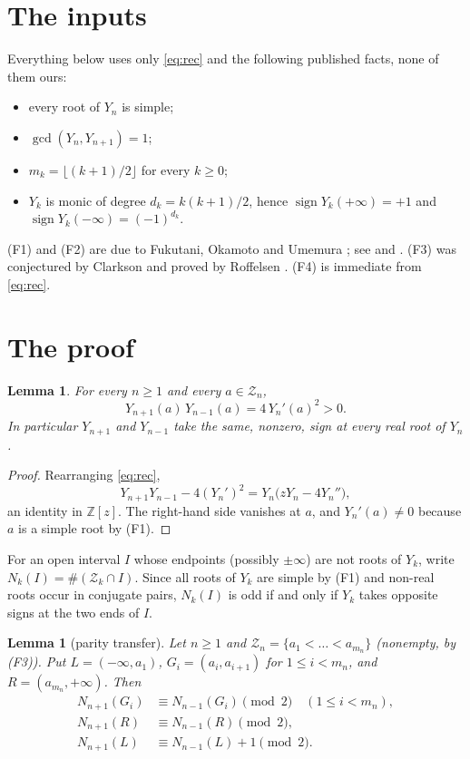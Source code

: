 \documentclass[11pt]{amsart}
\newtheorem{lemma}[theorem]{Lemma}
\theoremstyle{definition}
\DeclareMathOperator{\sgn}{sign}
\newcommand{\Zs}{\mathcal Z}
\newcommand{\NN}{N}
\begin{document}
\section{The inputs}

Everything below uses only \eqref{eq:rec} and the following published facts,
none of them ours:
\begin{itemize}
\item[(F1)] every root of $Y_n$ is simple;
\item[(F2)] $\gcd(Y_n,Y_{n+1})=1$;
\item[(F3)] $m_k=\lfloor(k+1)/2\rfloor$ for every $k\ge0$;
\item[(F4)] $Y_k$ is monic of degree $d_k=k(k+1)/2$, hence
 $\sgn Y_k(+\infty)=+1$ and $\sgn Y_k(-\infty)=(-1)^{d_k}$.
\end{itemize}
(F1) and (F2) are due to Fukutani, Okamoto and Umemura \cite{FOU}; see
\cite[Thm.~7.1]{ClarksonSMF} and \cite[Thm.~4]{Roffelsen2012}. (F3) was
conjectured by Clarkson \cite[Conj.~7.4]{ClarksonSMF} and proved by Roffelsen
\cite[Thm.~1]{Roffelsen2012}. (F4) is immediate from \eqref{eq:rec}.

\section{The proof}

\begin{lemma}\label{lem:sign}
For every $n\ge1$ and every $a\in\Zs_n$,
\[
 Y_{n+1}(a)\,Y_{n-1}(a)=4\,Y_n'(a)^2>0 .
\]
In particular $Y_{n+1}$ and $Y_{n-1}$ take the same, nonzero, sign at every real
root of $Y_n$.
\end{lemma}

\begin{proof}
Rearranging \eqref{eq:rec},
\begin{equation}\label{eq:l1}
 Y_{n+1}Y_{n-1}-4(Y_n')^2=Y_n\bigl(zY_n-4Y_n''\bigr),
\end{equation}
an identity in $\mathbb Z[z]$. The right-hand side vanishes at $a$, and
$Y_n'(a)\ne0$ because $a$ is a simple root by (F1).
\end{proof}

For an open interval $I$ whose endpoints (possibly $\pm\infty$) are not roots of
$Y_k$, write $\NN_k(I)=\#(\Zs_k\cap I)$. Since all roots of $Y_k$ are simple by
(F1) and non-real roots occur in conjugate pairs, $\NN_k(I)$ is odd if and only
if $Y_k$ takes opposite signs at the two ends of $I$.

\begin{lemma}[parity transfer]\label{lem:parity}
Let $n\ge1$ and $\Zs_n=\{a_1<\dots<a_{m_n}\}$ (nonempty, by (F3)). Put
$L=(-\infty,a_1)$, $G_i=(a_i,a_{i+1})$ for $1\le i<m_n$, and
$R=(a_{m_n},+\infty)$. Then
\begin{align*}
 \NN_{n+1}(G_i)&\equiv \NN_{n-1}(G_i)\pmod 2\quad(1\le i<m_n),\\
 \NN_{n+1}(R)&\equiv \NN_{n-1}(R)\pmod 2,\\
 \NN_{n+1}(L)&\equiv \NN_{n-1}(L)+1\pmod 2 .
\end{align*}
\end{lemma}
\end{document}
